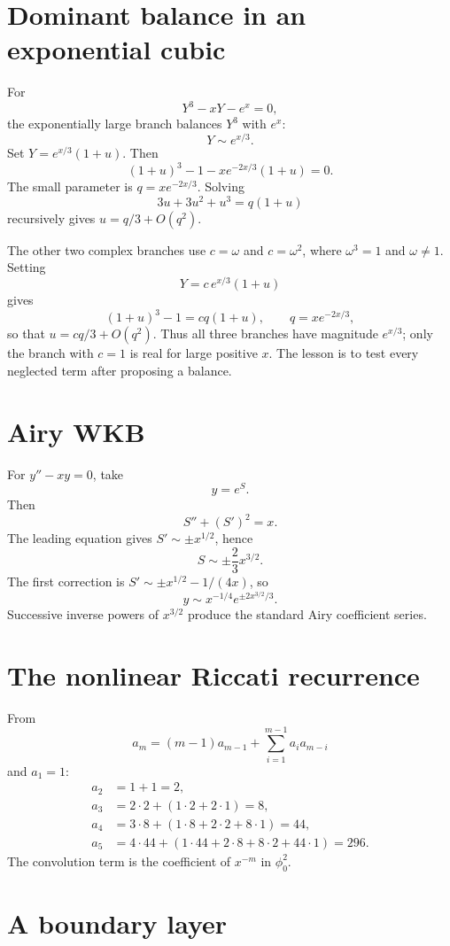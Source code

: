 \documentclass[11pt,openany]{book}
\theoremstyle{definition}
\theoremstyle{plain}
\theoremstyle{remark}
\newcommand{\asym}{\sim}
\begin{document}
\section{Dominant balance in an exponential cubic}

For
\[
 Y^3-xY-e^x=0,
\]
the exponentially large branch balances $Y^3$ with $e^x$:
\[
 Y\sim e^{x/3}.
\]
Set $Y=e^{x/3}(1+u)$. Then
\[
 (1+u)^3-1-xe^{-2x/3}(1+u)=0.
\]
The small parameter is $q=xe^{-2x/3}$. Solving
\[
 3u+3u^2+u^3=q(1+u)
\]
recursively gives $u=q/3+O(q^2)$.

The other two complex branches use $c=\omega$ and $c=\omega^2$, where
$\omega^3=1$ and $\omega\ne1$. Setting
\[
 Y=c\,e^{x/3}(1+u)
\]
gives
\[
 (1+u)^3-1=cq(1+u),
 \qquad q=xe^{-2x/3},
\]
so that $u=cq/3+O(q^2)$. Thus all three branches have magnitude
$e^{x/3}$; only the branch with $c=1$ is real for large positive $x$.
The lesson is to test every neglected term after proposing a balance.

\section{Airy WKB}

For $y''-xy=0$, take
\[
 y=e^S.
\]
Then
\[
 S''+(S')^2=x.
\]
The leading equation gives $S'\sim\pm x^{1/2}$, hence
\[
 S\sim\pm\frac23x^{3/2}.
\]
The first correction is $S'\sim\pm x^{1/2}-1/(4x)$, so
\[
 y\asym x^{-1/4}e^{\pm2x^{3/2}/3}.
\]
Successive inverse powers of $x^{3/2}$ produce the standard Airy coefficient series.

\section{The nonlinear Riccati recurrence}

From
\[
 a_m=(m-1)a_{m-1}+\sum_{i=1}^{m-1}a_ia_{m-i}
\]
and $a_1=1$:
\begin{align*}
 a_2&=1+1=2,\\
 a_3&=2\cdot2+(1\cdot2+2\cdot1)=8,\\
 a_4&=3\cdot8+(1\cdot8+2\cdot2+8\cdot1)=44,\\
 a_5&=4\cdot44+(1\cdot44+2\cdot8+8\cdot2+44\cdot1)=296.
\end{align*}
The convolution term is the coefficient of $x^{-m}$ in $\phi_0^2$.

\section{A boundary layer}
\end{document}
